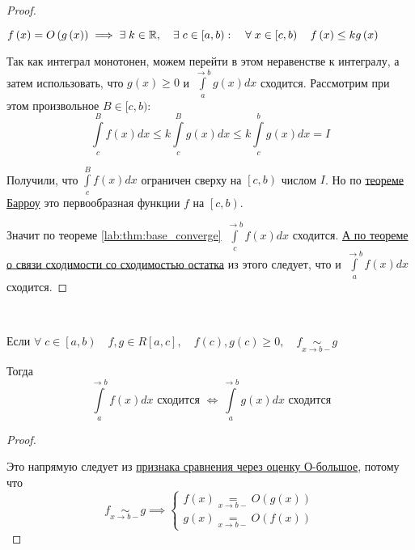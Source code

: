 \documentclass[../main.tex]{subfiles}
\begin{document}
\begin{proof}
    
    ~

    \( f\left( x\right) = O\left( g \left( x\right)\right) \implies \exists \; k \in \mathbb{R} ,\quad \exists \; c \in \left[ a,b\right):\quad \forall \; x \in \left[ c,b\right)\quad  f\left( x\right) \leq k g \left( x\right)\)

    Так как интеграл монотонен, можем перейти в этом неравенстве к интегралу, а затем использовать, что \( g \left( x\right) \geq 0\) и \( \displaystyle\int\limits_{ a}^{ \rightarrow b} g \left( x\right)dx\) сходится. Рассмотрим при этом произвольное \( B \in [c, b)\):
    \[ \displaystyle\int\limits_{ c}^{ B} f\left( x\right)dx \leq k \displaystyle\int\limits_{ c}^{ B} g \left( x\right)dx \leq k \displaystyle\int\limits_{ c}^{ b} g \left( x\right)dx=I\]
    
    Получили, что \( \displaystyle\int\limits_{ c}^{ B} f\left( x\right)dx\) ограничен сверху на \( \left[ c,b\right)\) числом \( I\). Но по \hyperlink{thm:barrow}{теореме Барроу} это первообразная функции \( f\) на \( \left[ c,b\right)\).

    Значит по теореме \ref{lab:thm:base_converge} \( \displaystyle\int\limits_{ c}^{ \rightarrow b} f\left( x\right)dx\) сходится. \hyperlink{thm:converge_rest}{А по теореме о связи сходимости со сходимостью остатка} из этого следует, что и \( \displaystyle\int\limits_{ a}^{ \rightarrow b} f\left( x\right)dx\) сходится.
\end{proof}

\begin{thm}
    
    ~

    Если \( \forall \; c \in \left[ a,b\right)\quad f,g \in R \left[ a,c\right],\quad f\left( c\right), g \left( c\right) \geq 0,\quad f\underset{x \rightarrow b-}{\sim} g\)

    Тогда 
    \[ \displaystyle\int\limits_{ a}^{ \rightarrow b} f\left( x\right)dx \text{ сходится } \Longleftrightarrow \displaystyle\int\limits_{ a}^{ \rightarrow b} g \left( x\right)dx \text{ сходится}\]
\end{thm}

\begin{proof}
    
    ~

    Это напрямую следует из \hyperlink{thm:converge_o}{признака сравнения через оценку О-большое}, потому что
    \begin{equation*}
        f \underset{x \rightarrow b-}{\sim} g \implies 
        \begin{cases}
            f\left( x\right)\underset{x \rightarrow b-}{=}O\left( g \left( x\right)\right)\\ 
            g \left( x\right)\underset{x \rightarrow b-}{=}O\left( f\left( x\right)\right)
        \end{cases}
    \end{equation*}
\end{proof}
\end{document}
